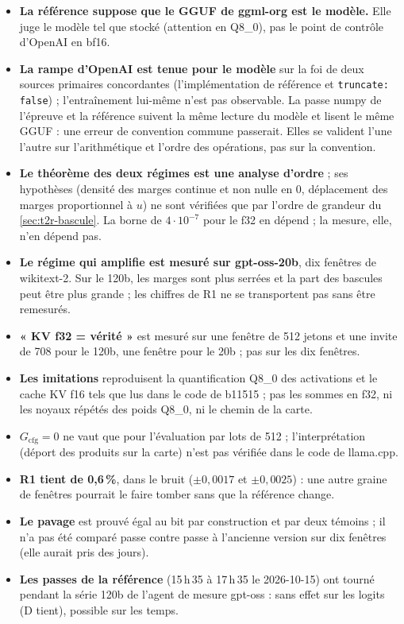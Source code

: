 \begin{faux}
\begin{itemize}
\item \textbf{La référence suppose que le GGUF de ggml-org est le modèle.} Elle juge le modèle tel que stocké (attention en Q8\_0), pas le point de contrôle d'OpenAI en bf16.
\item \textbf{La rampe d'OpenAI est tenue pour le modèle} sur la foi de deux sources primaires concordantes (l'implémentation de référence et \texttt{truncate: false}) ; l'entraînement lui-même n'est pas observable. La passe numpy de l'épreuve et la référence suivent la même lecture du modèle et lisent le même GGUF : une erreur de convention commune passerait. Elles se valident l'une l'autre sur l'arithmétique et l'ordre des opérations, pas sur la convention.
\item \textbf{Le théorème des deux régimes est une analyse d'ordre} ; ses hypothèses (densité des marges continue et non nulle en 0, déplacement des marges proportionnel à $u$) ne sont vérifiées que par l'ordre de grandeur du \cref{sec:t2r-bascule}. La borne de $4\cdot10^{-7}$ pour le f32 en dépend ; la mesure, elle, n'en dépend pas.
\item \textbf{Le régime qui amplifie est mesuré sur gpt-oss-20b}, dix fenêtres de wikitext-2. Sur le 120b, les marges sont plus serrées et la part des bascules peut être plus grande ; les chiffres de R1 ne se transportent pas sans être remesurés.
\item \textbf{« KV f32 = vérité »} est mesuré sur une fenêtre de 512 jetons et une invite de 708 pour le 120b, une fenêtre pour le 20b ; pas sur les dix fenêtres.
\item \textbf{Les imitations} reproduisent la quantification Q8\_0 des activations et le cache KV f16 tels que lus dans le code de b11515 ; pas les sommes en f32, ni les noyaux répétés des poids Q8\_0, ni le chemin de la carte.
\item \textbf{$G_{\text{cfg}} = 0$} ne vaut que pour l'évaluation par lots de 512 ; l'interprétation (déport des produits sur la carte) n'est pas vérifiée dans le code de llama.cpp.
\item \textbf{R1 tient de 0,6\,\%}, dans le bruit ($\pm0{,}0017$ et $\pm0{,}0025$) : une autre graine de fenêtres pourrait le faire tomber sans que la référence change.
\item \textbf{Le pavage} est prouvé égal au bit par construction et par deux témoins ; il n'a pas été comparé passe contre passe à l'ancienne version sur dix fenêtres (elle aurait pris des jours).
\item \textbf{Les passes de la référence} (15\,h\,35 à 17\,h\,35 le 2026-10-15) ont tourné pendant la série 120b de l'agent de mesure gpt-oss : sans effet sur les logits (D tient), possible sur les temps.
\end{itemize}
\end{faux}
